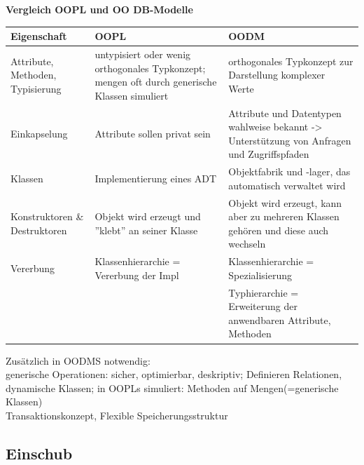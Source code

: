 \textbf{Vergleich OOPL und OO DB-Modelle}
\begin{table}[!h]
	\centering
	\begin{tabular}{|p{10em}|p{15em}|p{15em}|}
		\hline
		Eigenschaft	& OOPL	& OODM \\
		\hline
		\hline
		Attribute, Methoden, Typisierung	& untypisiert oder wenig orthogonales Typkonzept; mengen oft durch generische Klassen simuliert & orthogonales Typkonzept zur Darstellung komplexer Werte\\
		\hline
		Einkapselung	& Attribute sollen privat sein	& Attribute und Datentypen wahlweise bekannt -> Unterstützung von Anfragen und Zugriffspfaden\\
		\hline
		Klassen & Implementierung eines ADT	& Objektfabrik und -lager, das automatisch verwaltet wird\\
		\hline
		Konstruktoren \& Destruktoren	& Objekt wird erzeugt und ''klebt'' an seiner Klasse & Objekt wird erzeugt, kann aber zu mehreren Klassen gehören und diese auch wechseln\\
		\hline
		Vererbung	& Klassenhierarchie = Vererbung der Impl	& Klassenhierarchie = Spezialisierung\\
																&& Typhierarchie = Erweiterung der anwendbaren Attribute, Methoden\\
		\hline
	\end{tabular}
\end{table}
Zusätzlich in OODMS notwendig: \\
generische Operationen: sicher, optimierbar, deskriptiv; Definieren Relationen, dynamische Klassen; in OOPLs simuliert: Methoden auf Mengen(=generische Klassen) \\
Transaktionskonzept, Flexible Speicherungsstruktur

\subsection{Einschub}

